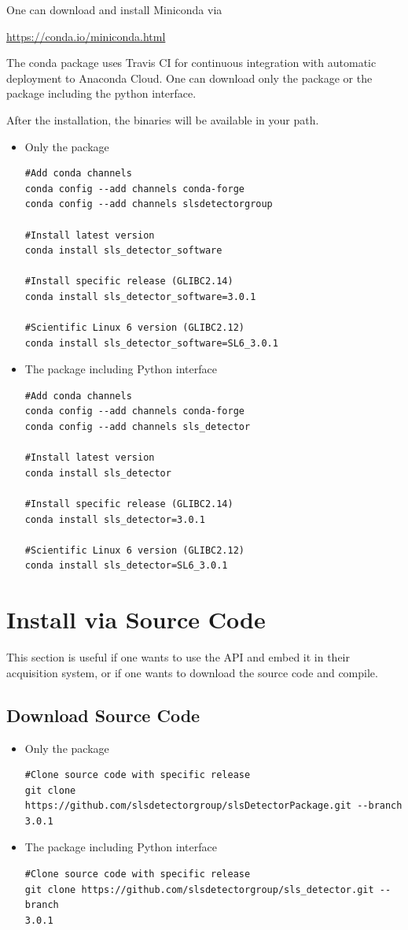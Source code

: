 \documentclass{article}
\begin{document}
\noindent One can download and install Miniconda via 

\url{https://conda.io/miniconda.html} \bigskip

\noindent The conda package uses Travis CI for continuous integration with
automatic deployment to Anaconda Cloud. One can download only the package or the
package including the python interface. \bigskip

\noindent After the installation, the binaries will be available in your path.


\begin{itemize}
 \item Only the package
\begin{verbatim}
#Add conda channels
conda config --add channels conda-forge
conda config --add channels slsdetectorgroup

#Install latest version
conda install sls_detector_software

#Install specific release (GLIBC2.14)
conda install sls_detector_software=3.0.1

#Scientific Linux 6 version (GLIBC2.12)
conda install sls_detector_software=SL6_3.0.1
\end{verbatim}
 \item The package including Python interface
\begin{verbatim}
#Add conda channels
conda config --add channels conda-forge
conda config --add channels sls_detector

#Install latest version
conda install sls_detector

#Install specific release (GLIBC2.14)
conda install sls_detector=3.0.1

#Scientific Linux 6 version (GLIBC2.12)
conda install sls_detector=SL6_3.0.1
\end{verbatim}
\end{itemize}


\clearpage
\section{Install via Source Code}
This section is useful if one wants to use the API and embed it in their
acquisition system, or if one wants to download the source code and compile.

\subsection{Download Source Code}

\begin{itemize}
 \item Only the package
\begin{verbatim}
#Clone source code with specific release
git clone https://github.com/slsdetectorgroup/slsDetectorPackage.git --branch
3.0.1
\end{verbatim}
 \item The package including Python interface
\begin{verbatim}
#Clone source code with specific release
git clone https://github.com/slsdetectorgroup/sls_detector.git --branch
3.0.1
\end{verbatim}
\end{itemize}
\end{document}
